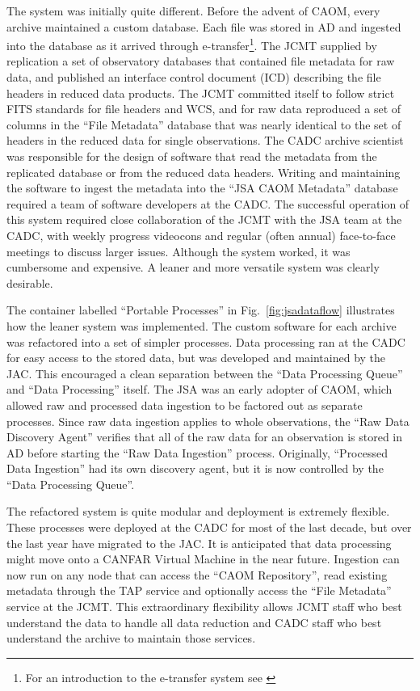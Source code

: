 \documentclass[final,authoryear,5p,times,twocolumn]{elsarticle}
\newcommand*\figref[1]{Fig.~\ref{#1}}
\begin{document}
The system was initially quite different.  Before the advent of CAOM, every archive maintained a custom database.  Each file was stored in AD and ingested into the database as it arrived through e-transfer\footnote{For an introduction to the e-transfer system see \citet{2005ASPC..347..647M}}.  The JCMT supplied by replication a set of observatory databases that contained file metadata for raw data, and published an interface control document (ICD) describing the file headers in reduced data products. The JCMT committed itself to follow strict FITS standards for file headers and WCS, and for raw data reproduced a set of columns in the ``File Metadata'' database that was nearly identical  to the set of headers in the reduced data for single observations.   The CADC archive scientist was responsible for the design of software that read the metadata from the replicated database or from the reduced data headers.  Writing and maintaining the software to ingest the metadata into the ``JSA CAOM Metadata'' database required a team of software developers at the CADC.  The successful operation of this system required close collaboration of the JCMT with the JSA team at the CADC, with weekly progress videocons and regular (often annual) face-to-face meetings to discuss larger issues.  Although the system worked, it was cumbersome and expensive.  A leaner and more versatile system was clearly desirable.

The container labelled ``Portable Processes'' in \figref{fig:jsadataflow} illustrates how the leaner system was implemented.  The custom software for each archive was refactored into a set of simpler processes.  Data processing ran at the CADC for easy access to the stored data, but was developed and maintained by the JAC.  This encouraged a clean separation between the ``Data Processing Queue'' and  ``Data Processing'' itself.    The JSA was an early adopter of CAOM, which allowed raw and processed data ingestion to be factored out as separate processes.  Since raw data ingestion applies to whole observations, the ``Raw Data Discovery Agent'' verifies that all of the raw data for an observation is stored in AD before starting the ``Raw Data Ingestion'' process.  Originally, ``Processed Data Ingestion'' had its own discovery agent, but it is now controlled by the ``Data Processing Queue''.

The refactored system is quite modular and deployment is extremely flexible. These processes were deployed at the CADC for most of the last decade, but over the last year have migrated to the JAC.  It is anticipated that data processing might move onto a CANFAR Virtual Machine in the near future.  Ingestion can now run on any node that can access the ``CAOM Repository'', read existing metadata through the TAP service and optionally access the ``File Metadata'' service at the JCMT.   This extraordinary flexibility allows JCMT staff who best understand the data to handle all data reduction and CADC staff who best understand the archive to maintain those services.
\end{document}
